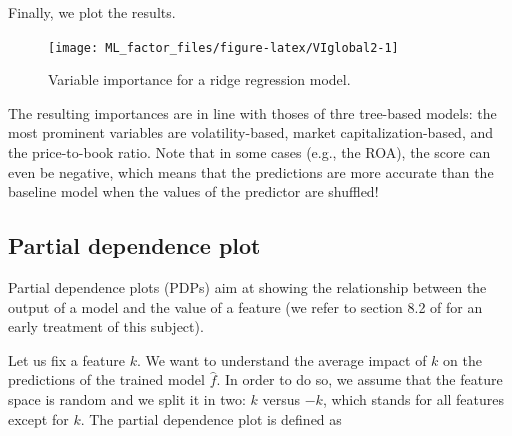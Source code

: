 \documentclass[]{krantz}
\makeatletter
\newenvironment{Shaded}{\begin{snugshade}}{\end{snugshade}}
\newcommand{\DataTypeTok}[1]{\textcolor[rgb]{0.27,0.27,0.27}{#1}}
\newcommand{\DecValTok}[1]{\textcolor[rgb]{0.06,0.06,0.06}{#1}}
\newcommand{\KeywordTok}[1]{\textcolor[rgb]{0.27,0.27,0.27}{\textbf{#1}}}
\newcommand{\NormalTok}[1]{#1}
\newcommand{\OperatorTok}[1]{\textcolor[rgb]{0.43,0.43,0.43}{\textbf{#1}}}
\newcommand{\StringTok}[1]{\textcolor[rgb]{0.5,0.5,0.5}{#1}}
\newenvironment{kframe}{%
\medskip{}
\setlength{\fboxsep}{.8em}
 \def\at@end@of@kframe{}%
 \ifinner\ifhmode%
  \def\at@end@of@kframe{\end{minipage}}%
  \begin{minipage}{\columnwidth}%
 \fi\fi%
 \def\FrameCommand##1{\hskip\@totalleftmargin \hskip-\fboxsep
 \colorbox{shadecolor}{##1}\hskip-\fboxsep
     \hskip-\linewidth \hskip-\@totalleftmargin \hskip\columnwidth}%
 \MakeFramed {\advance\hsize-\width
   \@totalleftmargin\z@ \linewidth\hsize
   \@setminipage}}%
 {\par\unskip\endMakeFramed%
 \at@end@of@kframe}
\renewenvironment{Shaded}{\begin{kframe}}{\end{kframe}}
\theoremstyle{definition}
\theoremstyle{definition}
\theoremstyle{definition}
\theoremstyle{remark}
\makeatother
\begin{document}
\normalsize

Finally, we plot the results.

\footnotesize

\begin{Shaded}
\end{Shaded}

\begin{figure}[H]

{\centering \texttt{[image: ML\_factor\_files/figure-latex/VIglobal2-1]} 

}

\caption{Variable importance for a ridge regression model.}\label{fig:VIglobal2}
\end{figure}

\normalsize

The resulting importances are in line with thoses of thre tree-based
models: the most prominent variables are volatility-based, market
capitalization-based, and the price-to-book ratio. Note that in some
cases (e.g., the ROA), the score can even be negative, which means that
the predictions are more accurate than the baseline model when the
values of the predictor are shuffled!

\hypertarget{partial-dependence-plot}{%
\subsection{Partial dependence plot}\label{partial-dependence-plot}}

Partial dependence plots (PDPs) aim at showing the relationship between
the output of a model and the value of a feature (we refer to section
8.2 of \citet{friedman2001greedy} for an early treatment of this
subject).

Let us fix a feature \(k\). We want to understand the average impact of
\(k\) on the predictions of the trained model \(\hat{f}\). In order to
do so, we assume that the feature space is random and we split it in
two: \(k\) versus \(-k\), which stands for all features except for
\(k\). The partial dependence plot is defined as
\end{document}
